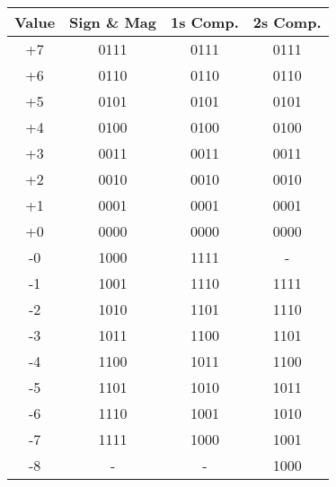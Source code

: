 \begin{tabular*}{\linewidth}{@{\extracolsep{\fill}}cccc}
    \toprule
    Value        & Sign \& Mag & 1s Comp.    & 2s Comp.      \\
    \midrule
    +7         & {0111}    & {0111} & {0111} \\
    +6         & {0110}    & {0110} & {0110} \\
    +5         & {0101}    & {0101} & {0101} \\
    +4         & {0100}    & {0100} & {0100} \\
    +3         & {0011}    & {0011} & {0011} \\
    +2         & {0010}    & {0010} & {0010} \\
    +1         & {0001}    & {0001} & {0001} \\
    +0         & {0000}    & {0000} & {0000} \\
    \midrule
    -0         & {1000}    & {1111} & {-}    \\
    -1         & {1001}    & {1110} & {1111} \\
    -2         & {1010}    & {1101} & {1110} \\
    -3         & {1011}    & {1100} & {1101} \\
    -4         & {1100}    & {1011} & {1100} \\
    -5         & {1101}    & {1010} & {1011} \\
    -6         & {1110}    & {1001} & {1010} \\
    -7         & {1111}    & {1000} & {1001} \\
    -8         & {-}       & {-}    & {1000} \\
    \bottomrule
\end{tabular*}
